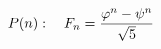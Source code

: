\documentclass[preview]{standalone}
\begin{document}
\begin{align*}
\special{dvisvgm:raw <g id='unique000'>}P(n): \quad F_n = \frac{\varphi^n - \psi^n}{\sqrt{5}}\special{dvisvgm:raw </g>}
\end{align*}
\end{document}
